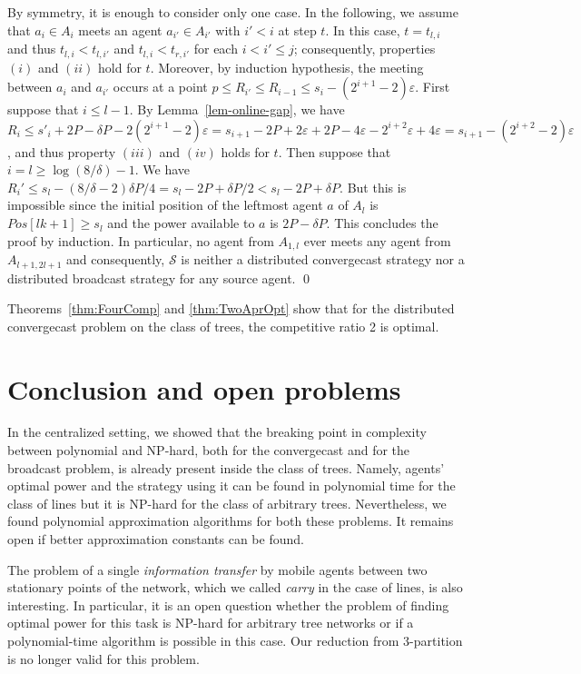 \documentclass{article}
\newenvironment{proofof}[1]{\medskip\noindent {\bf Proof of #1 : }} { \qed \medskip }
\newcommand{\cA}{\ensuremath{\mathcal{S}\xspace}}
\newcommand\convergecast{convergecast\xspace}
\newcommand\broadcast{broadcast\xspace}
\begin{document}
\begin{proofof}{Theorem \ref{thm:TwoAprOpt}}
By symmetry, it is enough to consider only one case. In the following,
we assume that $a_i \in A_i$ meets an agent $a_{i'} \in A_{i'}$ with
$i' < i$ at step $t$.  In this case, $t = t_{l,i}$ and thus $t_{l,i} <
t_{l,i'}$ and $t_{l,i} < t_{r,i'}$ for each $i < i'\leq j$; consequently, properties $(i)$ and
$(ii)$ hold for $t$.  Moreover, by induction hypothesis, the meeting between
$a_i$ and $a_{i'}$ occurs at a point $p \leq R_{i'} \leq R_{i-1} \leq
s_{i}-(2^{i+1}-2)\varepsilon$. First suppose that $i \leq l-1$.  By
Lemma~\ref{lem-online-gap}, we have $R_i \leq s'_{i} + 2P -\delta P
-2(2^{i+1}-2)\varepsilon = s_{i+1} - 2P + 2\varepsilon +2P -
4\varepsilon - 2^{i+2}\varepsilon + 4\varepsilon = s_{i+1} -
(2^{i+2}-2)\varepsilon$, and thus property $(iii)$ and $(iv)$ holds for $t$. Then suppose that $i =
l \geq \log(8/\delta)-1$. We have $R_i' \leq s_{l}-(8/\delta-2)\delta
P/4 = s_{l}-2P+\delta P/2 < s_{l}-2P+\delta P$. But this is impossible
since the initial position of the leftmost agent $a$ of $A_{l}$ is
$Pos[lk+1]\geq s_l$ and the power available to $a$ is $2P-\delta P$.
This concludes the proof by induction. In particular, no agent from $A_{1,l}$ ever meets any agent from
$A_{l+1,2l+1}$ and consequently, $\cA$ is neither a distributed
{\convergecast} strategy nor a distributed
{\broadcast} strategy for any source agent.
\end{proofof}






Theorems~\ref{thm:FourComp} and \ref{thm:TwoAprOpt} show that for the distributed convergecast problem on the class of trees, the competitive ratio 2 is optimal. 

\section{Conclusion and open problems}\label{s:open}



In the centralized setting, we showed that the breaking point in complexity between polynomial and NP-hard, both for the convergecast and for the broadcast problem, is already present inside the class of trees. Namely, agents' optimal power and the strategy using it can be found in polynomial time for the class of lines but it is NP-hard for the class of arbitrary trees. Nevertheless, we found polynomial approximation algorithms for both these problems. It remains open if better approximation constants can be found.

The problem of a single {\em information transfer} by mobile agents between two stationary points of the network, which we called \emph{carry} in the case of lines, is also interesting. In particular, it is an open question whether the problem of finding optimal power for this task is NP-hard for arbitrary tree networks or if a polynomial-time algorithm is possible in this case. Our reduction from 3-partition is no longer valid for this problem. 
\end{document}
